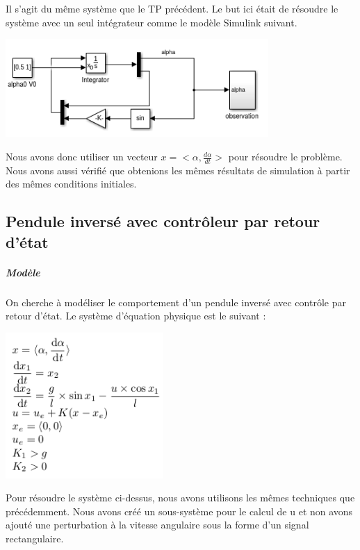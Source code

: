 \documentclass[a4paper,12pt]{article}
\begin{document}
Il s'agit du même système que le TP précédent. Le but ici était de résoudre le système avec un seul intégrateur comme le modèle Simulink suivant.

\begin{center}
\includegraphics[width=10cm]{./img/tp2_ps.png}
\end{center}

Nous avons donc utiliser un vecteur $x = <\alpha, \frac{d\alpha}{dt}> $ pour résoudre le problème.\\

Nous avons aussi vérifié que obtenions les mêmes résultats de simulation à partir des mêmes conditions initiales.

\subsection{Pendule inversé avec contrôleur par retour d'état}
\subparagraph{Modèle}

On cherche à modéliser le comportement d'un pendule inversé avec contrôle par retour d'état. Le système d'équation physique est le suivant :

\begin{center}
\includegraphics[width=6cm]{./img/tp2_eq.png}
\end{center}

Pour résoudre le système ci-dessus, nous avons utilisons les mêmes techniques que précédemment. Nous avons créé un sous-système pour le calcul de u et non avons ajouté une perturbation à la vitesse angulaire sous la forme d'un signal rectangulaire.
\end{document}
